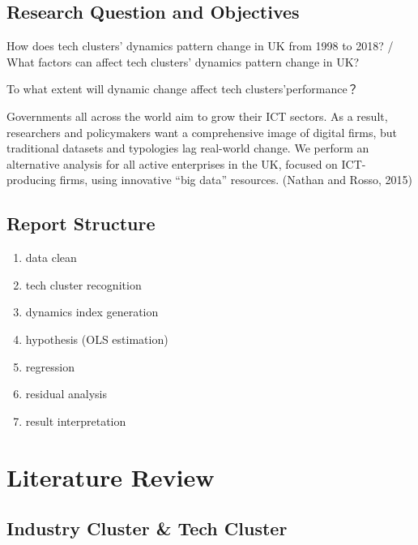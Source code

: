 \documentclass[
  12pt,
  oneside]{book}
\providecommand{\tightlist}{%
  \setlength{\itemsep}{0pt}\setlength{\parskip}{0pt}}
\begin{document}
\hypertarget{research-question-and-objectives}{%
\section{Research Question and Objectives}\label{research-question-and-objectives}}

How does tech clusters' dynamics pattern change in UK from 1998 to 2018? / What factors can affect tech clusters' dynamics pattern change in UK?

To what extent will dynamic change affect tech clusters'performance？

Governments all across the world aim to grow their ICT sectors. As a result, researchers and policymakers want a comprehensive image of digital firms, but traditional datasets and typologies lag real-world change. We perform an alternative analysis for all active enterprises in the UK, focused on ICT-producing firms, using innovative ``big data'' resources.
(Nathan and Rosso, 2015)

\hypertarget{report-structure}{%
\section{Report Structure}\label{report-structure}}

\begin{enumerate}
\def\labelenumi{\arabic{enumi}.}
\tightlist
\item
  data clean
\item
  tech cluster recognition
\item
  dynamics index generation
\item
  hypothesis (OLS estimation)
\item
  regression
\item
  residual analysis
\item
  result interpretation
\end{enumerate}

\hypertarget{crossref}{%
\chapter{Literature Review}\label{crossref}}

\hypertarget{industry-cluster-tech-cluster}{%
\section{Industry Cluster \& Tech Cluster}\label{industry-cluster-tech-cluster}}
\end{document}
